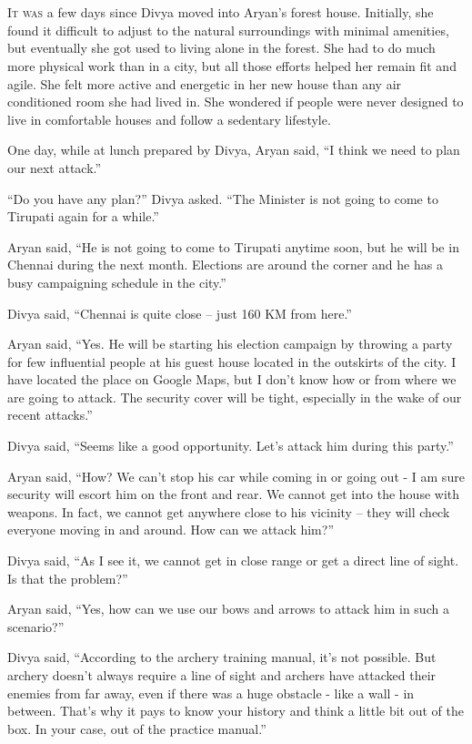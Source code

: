 \chapter{}

\lettrine{I}{t was} a few days since Divya moved into Aryan's forest house. Initially, she
found it difficult to adjust to the natural surroundings with minimal amenities,
but eventually she got used to living alone in the forest. She had to do much
more physical work than in a city, but all those efforts helped her remain fit
and agile. She felt more active and energetic in her new house than any air
conditioned room she had lived in. She wondered if people were never designed to
live in comfortable houses and follow a sedentary lifestyle.

One day, while at lunch prepared by Divya, Aryan said, “I think we need to plan
our next attack.”

“Do you have any plan?” Divya asked. “The Minister is not going to come to
Tirupati again for a while.”

Aryan said, “He is not going to come to Tirupati anytime soon, but he will be in
Chennai during the next month. Elections are around the corner and he has a busy
campaigning schedule in the city.”

Divya said, “Chennai is quite close – just 160 KM from here.”

Aryan said, “Yes. He will be starting his election campaign by throwing a party
for few influential people at his guest house located in the outskirts of the
city. I have located the place on Google Maps, but I don't know how or from
where we are going to attack. The security cover will be tight, especially in
the wake of our recent attacks.”

Divya said, “Seems like a good opportunity. Let's attack him during this party.”

Aryan said, “How? We can't stop his car while coming in or going out - I am sure
security will escort him on the front and rear. We cannot get into the house
with weapons. In fact, we cannot get anywhere close to his vicinity – they will
check everyone moving in and around. How can we attack him?”

Divya said, “As I see it, we cannot get in close range or get a direct line of
sight. Is that the problem?”

Aryan said, “Yes, how can we use our bows and arrows to attack him in such a
scenario?”

Divya said, “According to the archery training manual, it's not possible. But
archery doesn't always require a line of sight and archers have attacked their
enemies from far away, even if there was a huge obstacle - like a wall - in
between. That's why it pays to know your history and think a little bit out of
the box. In your case, out of the practice manual.”

